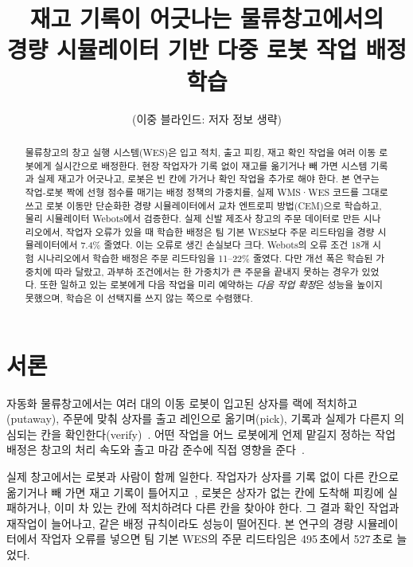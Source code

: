 \documentclass[10pt,twocolumn]{article}
\title{재고 기록이 어긋나는 물류창고에서의\\경량 시뮬레이터 기반 다중 로봇 작업 배정 학습}
\author{(이중 블라인드: 저자 정보 생략)}
\date{}
\begin{document}
\maketitle

\begin{abstract}
물류창고의 창고 실행 시스템(WES)은 입고 적치, 출고 피킹, 재고 확인 작업을 여러 이동 로봇에게 실시간으로 배정한다.
현장 작업자가 기록 없이 재고를 옮기거나 빼 가면 시스템 기록과 실제 재고가 어긋나고, 로봇은 빈 칸에 가거나 확인 작업을 추가로 해야 한다.
본 연구는 작업-로봇 짝에 선형 점수를 매기는 배정 정책의 가중치를, 실제 WMS·WES 코드를 그대로 쓰고 로봇 이동만 단순화한 경량 시뮬레이터에서 교차 엔트로피 방법(CEM)으로 학습하고, 물리 시뮬레이터 Webots에서 검증한다.
실제 신발 제조사 창고의 주문 데이터로 만든 시나리오에서, 작업자 오류가 있을 때 학습한 배정은 팀 기본 WES보다 주문 리드타임을 경량 시뮬레이터에서 7.4\% 줄였다. 이는 오류로 생긴 손실보다 크다.
Webots의 오류 조건 18개 시험 시나리오에서 학습한 배정은 주문 리드타임을 11--22\% 줄였다. 다만 개선 폭은 학습된 가중치에 따라 달랐고, 과부하 조건에서는 한 가중치가 큰 주문을 끝내지 못하는 경우가 있었다.
또한 일하고 있는 로봇에게 다음 작업을 미리 예약하는 \emph{다음 작업 확정}은 성능을 높이지 못했으며, 학습은 이 선택지를 쓰지 않는 쪽으로 수렴했다.
\end{abstract}

\section{서론}

자동화 물류창고에서는 여러 대의 이동 로봇이 입고된 상자를 랙에 적치하고(putaway), 주문에 맞춰 상자를 출고 레인으로 옮기며(pick),
기록과 실제가 다른지 의심되는 칸을 확인한다(verify)~\cite{wurman2008}.
어떤 작업을 어느 로봇에게 언제 맡길지 정하는 작업 배정은 창고의 처리 속도와 출고 마감 준수에 직접 영향을 준다~\cite{gerkey2004}.

실제 창고에서는 로봇과 사람이 함께 일한다.
작업자가 상자를 기록 없이 다른 칸으로 옮기거나 빼 가면 재고 기록이 틀어지고~\cite{dehoratius2008},
로봇은 상자가 없는 칸에 도착해 피킹에 실패하거나, 이미 차 있는 칸에 적치하려다 다른 칸을 찾아야 한다.
그 결과 확인 작업과 재작업이 늘어나고, 같은 배정 규칙이라도 성능이 떨어진다.
본 연구의 경량 시뮬레이터에서 작업자 오류를 넣으면 팀 기본 WES의 주문 리드타임은 495\,초에서 527\,초로 늘었다. %
\end{document}
